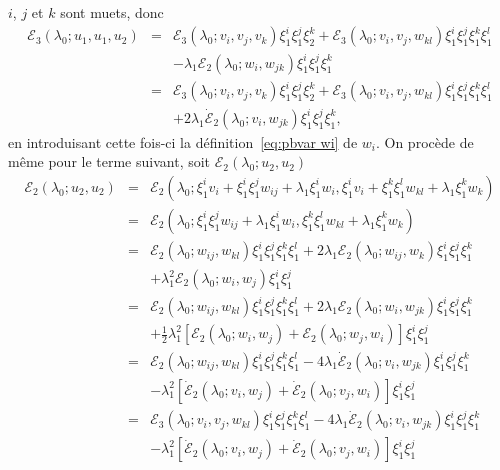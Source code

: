 \documentclass{article}
\begin{document}
$i$, $j$ et $k$ sont muets, donc
\begin{eqnarray*}
  \mathcal{E}_3 (λ_0 ; u_1, u_1, u_2) & = & \mathcal{E}_3 (λ_0 ;
  v_i, v_j, v_k) \xi_1^i \xi_1^j \xi_2^k +\mathcal{E}_3 (λ_0 ; v_i, v_j,
  w_{k  l}) \xi_1^i \xi_1^j \xi_1^k \xi_1^l\\
  &  &  - λ_1 \mathcal{E}_2 (λ_0 ; w_{i }, w_{j
   k}) \xi_1^i \xi_1^j \xi_1^k\\
  & = & \mathcal{E}_3 (λ_0 ; v_i, v_j, v_k) \xi_1^i \xi_1^j \xi_2^k
  +\mathcal{E}_3 (λ_0 ; v_i, v_j, w_{k  l}) \xi_1^i \xi_1^j
  \xi_1^k \xi_1^l\\
  &  &  + 2 λ_1  \dot{\mathcal{E}}_2 (λ_0 ; v_{i
  }, w_{j  k}) \xi_1^i \xi_1^j \xi_1^k,
\end{eqnarray*}
en introduisant cette fois-ci la définition~\eqref{eq:pbvar wi} de $w_i .$
On procède de même pour le terme suivant, soit $\mathcal{E}_2
(λ_0 ; u_2, u_2)$
\begin{eqnarray*}
  \mathcal{E}_2 (λ_0 ; u_2, u_2) & = & \mathcal{E}_2 (λ_0 ;
  \xi_1^i v_i + \xi_1^i \xi_1^j w_{i  j} + λ_1 \xi_1^i w_i,
  \xi_1^i v_i + \xi_1^k \xi_1^l w_{k  l} + λ_1 \xi_1^k w_k)\\
  & = & \mathcal{E}_2 (λ_0 ; \xi_1^i \xi_1^j w_{i  j} +
  λ_1 \xi_1^i w_i, \xi_1^k \xi_1^l w_{k  l} + λ_1 \xi_1^k
  w_k)\\
  & = & \mathcal{E}_2 (λ_0 ; w_{i  j}, w_{k  l})
  \xi_1^i \xi_1^j \xi_1^k \xi_1^l + 2 λ_1 \mathcal{E}_2 (λ_0 ;
  w_{i  j}, w_k) \xi_1^i \xi_1^j \xi_1^k\\
  &  &  + λ_1^2 \mathcal{E}_2 (λ_0 ; w_i, w_j) \xi_1^i
  \xi_1^j\\
  & = & \mathcal{E}_2 (λ_0 ; w_{i  j}, w_{k  l})
  \xi_1^i \xi_1^j \xi_1^k \xi_1^l + 2 λ_1 \mathcal{E}_2 (λ_0 ;
  w_i, w_{j  k}) \xi_1^i \xi_1^j \xi_1^k\\
  &  &  + \tfrac{1}{2} λ_1^2  [\mathcal{E}_2 (λ_0 ; w_i,
  w_j) +\mathcal{E}_2 (λ_0 ; w_j, w_i)] \xi_1^i \xi_1^j\\
  & = & \mathcal{E}_2 (λ_0 ; w_{i  j}, w_{k  l})
  \xi_1^i \xi_1^j \xi_1^k \xi_1^l - 4 λ_1  \dot{\mathcal{E}}_2
  (λ_0 ; v_i, w_{j  k}) \xi_1^i \xi_1^j \xi_1^k\\
  &  &  - λ_1^2  [\dot{\mathcal{E}}_2 (λ_0 ; v_i, w_j) +
  \dot{\mathcal{E}}_2 (λ_0 ; v_j, w_i)] \xi_1^i \xi_1^j\\
  & = & \mathcal{E}_3 (λ_0 ; v_i, v_j, w_{k  l}) \xi_1^i
  \xi_1^j \xi_1^k \xi_1^l - 4 λ_1  \dot{\mathcal{E}}_2 (λ_0 ; v_i,
  w_{j  k}) \xi_1^i \xi_1^j \xi_1^k\\
  &  &  - λ_1^2  [\dot{\mathcal{E}}_2 (λ_0 ; v_i, w_j) +
  \dot{\mathcal{E}}_2 (λ_0 ; v_j, w_i)] \xi_1^i \xi_1^j
\end{eqnarray*}
\end{document}
